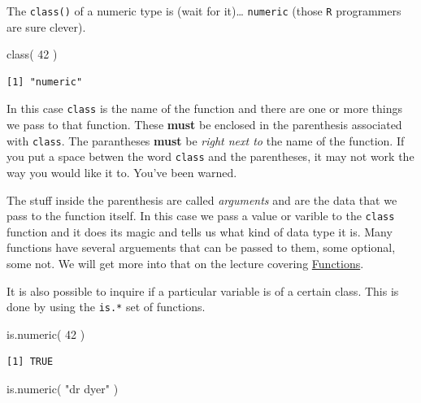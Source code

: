 \documentclass[
  letterpaper,
]{book}
\newenvironment{Shaded}{\begin{snugshade}}{\end{snugshade}}
\newcommand{\DecValTok}[1]{\textcolor[rgb]{0.68,0.00,0.00}{#1}}
\newcommand{\FunctionTok}[1]{\textcolor[rgb]{0.28,0.35,0.67}{#1}}
\newcommand{\NormalTok}[1]{\textcolor[rgb]{0.00,0.23,0.31}{#1}}
\newcommand{\StringTok}[1]{\textcolor[rgb]{0.13,0.47,0.30}{#1}}
\begin{document}
The \texttt{class()} of a numeric type is (wait for it)\ldots{}
\texttt{numeric} (those \texttt{R} programmers are sure clever).

\begin{Shaded}
\begin{Highlighting}[]
\FunctionTok{class}\NormalTok{( }\DecValTok{42}\NormalTok{ )}
\end{Highlighting}
\end{Shaded}

\begin{verbatim}
[1] "numeric"
\end{verbatim}

In this case \texttt{class} is the name of the function and there are
one or more things we pass to that function. These \textbf{must} be
enclosed in the parenthesis associated with \texttt{class}. The
parantheses \textbf{must} be \emph{right next to} the name of the
function. If you put a space betwen the word \texttt{class} and the
parentheses, it may not work the way you would like it to. You've been
warned.

The stuff inside the parenthesis are called \emph{arguments} and are the
data that we pass to the function itself. In this case we pass a value
or varible to the \texttt{class} function and it does its magic and
tells us what kind of data type it is. Many functions have several
arguements that can be passed to them, some optional, some not. We will
get more into that on the lecture covering
\href{https://dyerlab.github.io/ENVS-Lectures/functions/slides.html}{Functions}.

It is also possible to inquire if a particular variable is of a certain
class. This is done by using the \texttt{is.*} set of functions.

\begin{Shaded}
\begin{Highlighting}[]
\FunctionTok{is.numeric}\NormalTok{( }\DecValTok{42}\NormalTok{ )}
\end{Highlighting}
\end{Shaded}

\begin{verbatim}
[1] TRUE
\end{verbatim}

\begin{Shaded}
\begin{Highlighting}[]
\FunctionTok{is.numeric}\NormalTok{( }\StringTok{"dr dyer"}\NormalTok{ )}
\end{Highlighting}
\end{Shaded}
\end{document}
